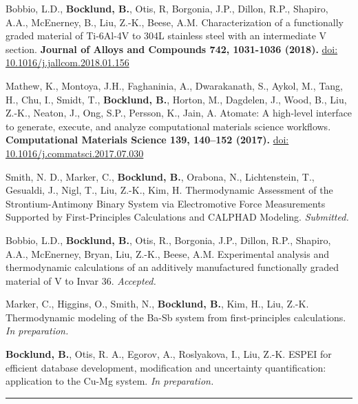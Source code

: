 \documentclass[10pt,letterpaper]{article}
\begin{document}
\begin{itemize*}
\item Bobbio, L.D., \textbf{Bocklund, B.}, Otis, R, Borgonia, J.P.,
  Dillon, R.P., Shapiro, A.A., McEnerney, B., Liu, Z.-K., Beese, A.M.
  Characterization of a functionally graded material of Ti-6Al-4V to 304L stainless steel with an intermediate V section. \textbf{Journal of Alloys and Compounds 742, 1031-1036 (2018).} \href{https://doi.org/10.1016/j.jallcom.2018.01.156}{doi: 10.1016/j.jallcom.2018.01.156}

\item Mathew, K., Montoya, J.H., Faghaninia, A., Dwarakanath, S., Aykol, M.,
  Tang, H., Chu, I., Smidt, T., \textbf{Bocklund, B.}, Horton, M., Dagdelen, J., Wood, B., Liu, Z.-K., Neaton, J., Ong, S.P., Persson, K., Jain, A.
 Atomate: A high-level interface to generate, execute,
  and analyze computational materials science workflows. \textbf{Computational Materials Science 139, 140–152 (2017).}
  \href{https://doi.org/10.1016/j.commatsci.2017.07.030}{doi: 10.1016/j.commatsci.2017.07.030}

\item Smith, N. D., Marker, C., \textbf{Bocklund, B.}, Orabona, N., Lichtenstein, T.,
  Gesualdi, J., Nigl, T., Liu, Z.-K., Kim, H. Thermodynamic Assessment of the
  Strontium-Antimony Binary System via Electromotive Force Measurements
  Supported by First-Principles Calculations and CALPHAD Modeling. \emph{Submitted.}

\item Bobbio, L.D., \textbf{Bocklund, B.}, Otis, R., Borgonia, J.P., Dillon, R.P., Shapiro,
  A.A., McEnerney, Bryan, Liu, Z.-K., Beese, A.M.
  Experimental analysis and thermodynamic calculations of an additively manufactured functionally graded material of V to Invar 36. \emph{Accepted.}
  
\item Marker, C., Higgins, O., Smith, N., \textbf{Bocklund, B.}, Kim, H., Liu, Z.-K.
   Thermodynamic modeling of the Ba-Sb system from first-principles
   calculations. \emph{In preparation.}

\item \textbf{Bocklund, B.}, Otis, R. A., Egorov, A., Roslyakova, I., Liu, Z.-K.
  ESPEI for efficient database development, modification and uncertainty
  quantification: application to the Cu-Mg system. \emph{In preparation.}


\end{itemize*}

\hrule
\vspace{-0.6em}
\end{document}
